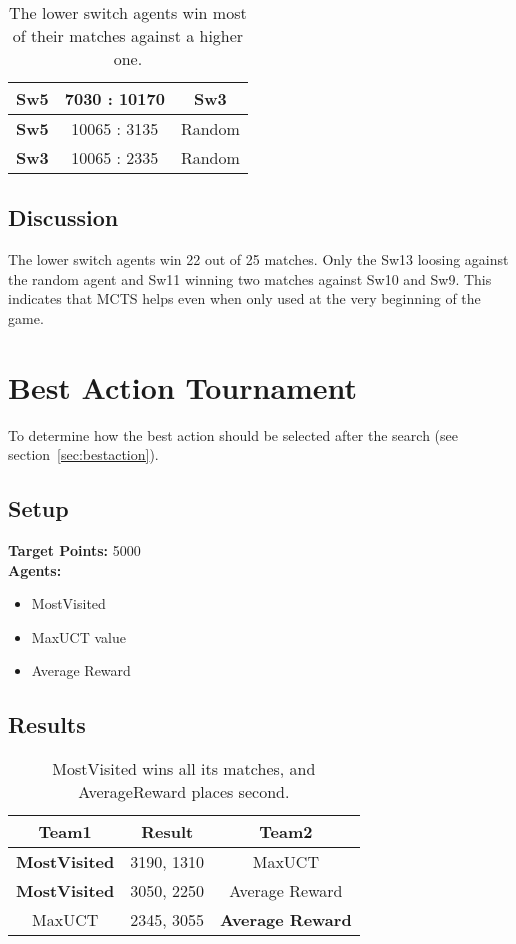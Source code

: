 \begin{table}[H]
\begin{tabular}{ccc}
    Sw5 & 7030 : 10170  & \textbf{Sw3}\\
    \hline
    \textbf{Sw5} & 10065 : 3135  & Random\\
    \hline

    \textbf{Sw3} & 10065 : 2335  & Random\\
    \hline

  \end{tabular}
  \caption[Result of the Switch Tournament]{The lower switch agents win most of their matches against a higher one.}
\end{table}

\subsection*{Discussion}
The lower switch agents win 22 out of 25 matches. Only the Sw13 loosing against the random agent and Sw11 winning two matches against Sw10 and Sw9. This indicates that MCTS helps even when only used at the very beginning of the game.


\section{Best Action Tournament}
\label{sec:bestactionexp}
To determine how the best action should be selected after the search (see section~\ref{sec:bestaction}).

\subsection*{Setup}
\textbf{Target Points:} 5000\\
\textbf{Agents:}
\begin{itemize}
    \setlength\itemsep{2px}
    \item MostVisited
    \item MaxUCT value
    \item Average Reward
\end{itemize}

\subsection*{Results}
\begin{table}[h!]
  \centering

  \begin{tabular}{ccc}
    \textbf{Team1} & \textbf{Result}  & \textbf{Team2}\\
    \hline
    \textbf{MostVisited} & 3190, 1310  & MaxUCT\\
    \hline
    \textbf{MostVisited} & 3050, 2250  & Average Reward\\
    \hline
    MaxUCT & 2345, 3055  & \textbf{Average Reward}\\
  \end{tabular}
  \caption[Result of the Best Action Tournament]{MostVisited wins all its matches, and AverageReward places second.}
\end{table}

